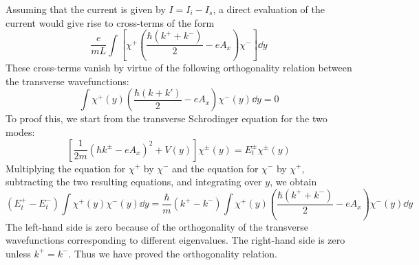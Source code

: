 \documentclass[11pt,a4paper]{book}
\theoremstyle{plain}
\theoremstyle{definition}
\theoremstyle{remark}
\begin{document}
Assuming that the current is given by $I = I_i - I_s$, a direct evaluation of the current would give rise to cross-terms of the form
\begin{equation}
    \frac{e}{m L}\int \left[\chi^+\left( \frac{\hbar(k^+ + k^-)}{2}-eA_x \right)\chi^- \right] \dd y
\end{equation}
These cross-terms vanish by virtue of the following orthogonality relation between the transverse wavefunctions:
\begin{equation}
    \int \chi^+(y) \left( \frac{\hbar (k+k')}{2} - e A_x \right) \chi^-(y) \dd y = 0
\end{equation}
To proof this, we start from the transverse Schrodinger equation for the two modes:
\begin{equation}
    \left[ \frac{1}{2 m} \left( \hbar k^{\pm} - e A_x \right)^2 + V(y) \right] \chi^{\pm}(y) = E_t^{\pm} \chi^{\pm}(y)
\end{equation}
Multiplying the equation for $\chi^+$ by $\chi^-$ and the equation for $\chi^-$ by $\chi^+$, subtracting the two resulting equations, and integrating over $y$, we obtain
\begin{equation}
    (E_t^+ - E_t^-) \int \chi^+(y) \chi^-(y) \dd y = \frac{\hbar}{m} (k^+ - k^-) \int \chi^+(y) \left( \frac{\hbar (k^+ + k^-)}{2} - e A_x \right) \chi^-(y) \dd y
\end{equation}
The left-hand side is zero because of the orthogonality of the transverse wavefunctions corresponding to different eigenvalues. The right-hand side is zero unless $k^+ = k^-$. Thus we have proved the orthogonality relation.
\end{document}
